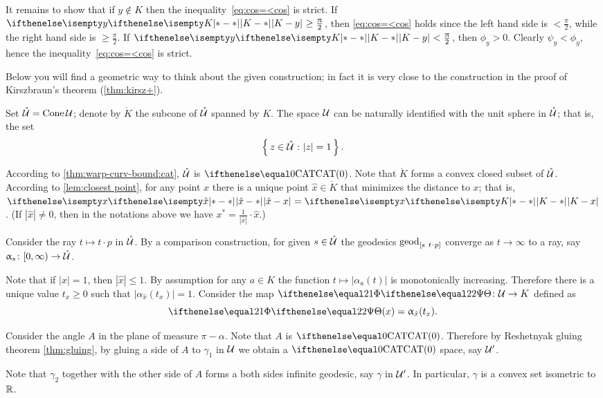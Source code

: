 It remains to show that if $y\notin K$ 
then the inequality~\ref{eq:cos=<cos}
is strict.
If $\dist{K}{y}{}\ge\tfrac\pi2$, then \ref{eq:cos=<cos} holds since 
the left hand side is $<\tfrac\pi2$,
while the right hand side is $\ge \tfrac\pi2$.
If $\dist{K}{y}{}<\tfrac\pi2$, then $\phi_y>0$. Clearly $\psi_y<\phi_y$,
hence the inequality~\ref{eq:cos=<cos} is strict.
\qeds

Below you will find a geometric way to think about the given construction; 
in fact it is very close to the construction 
in the proof of Kirszbraun's theorem (\ref{thm:kirsz+}).

Set $\mathring{\mathcal{U}}=\mathop{\rm Cone}\nolimits \mathcal{U}$;
denote by $\mathring{K}$ the subcone of $\mathring{\mathcal{U}}$ spanned by $K$.
The space $\mathcal{U}$ can be naturally identified with the unit sphere in $\mathring{\mathcal{U}}$;
that is, the set 
\[\set{z\in \mathring{\spc{U}}}{|z|=1}.\]

According to \ref{thm:warp-curv-bound:cat}, $\mathring{\mathcal{U}}$ is $\CAT0$.
Note that $\mathring{K}$ forms a convex closed subset of $\mathring{\mathcal{U}}$.
According to \ref{lem:closest point}, for any point $x$ there is a unique point $\hat x\in \mathring{K}$
that minimizes the distance to $x$;
that is, $\dist{\hat x}{x}{}=\dist{K}{x}{}$.
(If $|\hat x|\ne0$, then in the notations above we have
$x^*=\tfrac1{|\hat x|}\cdot\hat x$.)

Consider the ray $t\mapsto t\cdot p$ in  $\mathring{\mathcal{U}}$.
By a comparison construction, 
for given $s\in \mathring{\spc{U}}$
the geodesics $\geod_{[s\ t\cdot p]}$ converge as $t\to\infty$ to a ray, 
say $\alpha_s\:[0,\infty)\to \mathring{\spc{U}}$.



Note that if $|x|=1$, then $|\hat x|\le 1$.
By assumption for any $a\in K$ the function $t\mapsto |\alpha_a(t)|$ is monotonically increasing.
Therefore there is a unique value $t_x\ge 0$ such that
$|\alpha_{\hat x}(t_x)|=1$.
Consider the map $\map[2]\:\spc{U}\to K$
defined as 
\[\map[2](x)=\alpha_{\hat x}(t_x).\]

Consider the angle $A$ in the plane of measure $\pi-\alpha$.
Note that $A$ is $\CAT0$.
Therefore by Reshetnyak gluing theorem \ref{thm:gluing},
by gluing a side of $A$ to $\gamma_1$ in $\mathcal{U}$ we obtain a $\CAT0$ space, say $\mathcal{U}'$.

Note that $\gamma_2$ together with the other side of $A$ forms a both sides infinite geodesic, say $\gamma$ in $\mathcal{U}'$.
In particular, $\gamma$ is a convex set isometric to $\mathbb{R}$.

